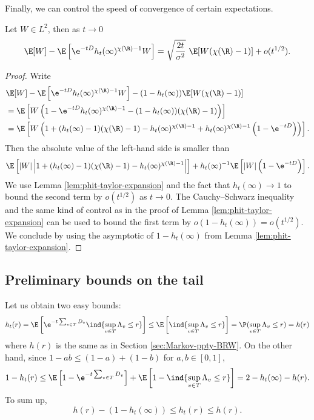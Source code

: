 \documentclass[10pt,a4paper]{article}
\begin{document}
Finally, we can control the speed of convergence of certain expectations. %
\begin{lemma}\label{lem:speed-cv-expectation-Et}
Let $W \in L^2$, then as $t\to 0$
\begin{equation}
\E[W] - \E\left[ \e^{-tD} h_t(\infty)^{\chi(\R)-1} W \right] = \sqrt{\frac{2t}{\sigma^2}} \ \E[ W(\chi(\R)-1) ] + o(t^{1/2}) .
\end{equation}
\end{lemma}

\begin{proof}
Write
\begin{align*}
&\E[W] - \E\left[ \e^{-tD} h_t(\infty)^{\chi(\R)-1} W \right] - (1-h_t(\infty)) \E[ W(\chi(\R)-1) ]  \\
&= \E\left[ W\left( 1 - \e^{-tD}h_t(\infty)^{\chi(\R)-1} - (1-h_t(\infty))(\chi(\R)-1) \right)\right] \\
&= \E\left[ W\left(1 + (h_t(\infty)-1)(\chi(\R)-1) - h_t(\infty)^{\chi(\R)-1} + h_t(\infty)^{\chi(\R)-1}\left( 1-\e^{-tD} \right) \right)\right] .
\end{align*}
Then the absolute value of the left-hand side is smaller than 
\begin{align*}
\E\left[|W| \left|1 + (h_t(\infty)-1)(\chi(\R)-1) - h_t(\infty)^{\chi(\R)-1}\right|\right] + h_t(\infty)^{-1} \E\left[|W| \left( 1-\e^{-tD} \right)\right] .
\end{align*}
We use Lemma \ref{lem:phit-taylor-expansion} and the fact that $h_t(\infty)\to 1$ to bound the second term by $o(t^{1/2})$ as $t\to 0$. The Cauchy--Schwarz inequality and the same kind of control as in the proof of Lemma \ref{lem:phit-taylor-expansion} can be used to bound the first term by $o(1-h_t(\infty)) = o(t^{1/2})$. We conclude by using the asymptotic of $1-h_t(\infty)$ from Lemma \ref{lem:phit-taylor-expansion}. 
\end{proof}









\subsection{Preliminary bounds on the tail}
\label{sec:2uniform-control}


Let us obtain two easy bounds:
\[ h_t(r) = \E\left[\e^{-t\sum_{v\in T} D_v} \ind{\sup_{v\in T} \Lambda_v \leq r}\right] \leq \E\left[ \ind{\sup_{v\in T} \Lambda_v \leq r}\right] = \P(\sup_{v\in T} \Lambda_v \leq r) = h(r) \]
where $h(r)$ is the same as in Section \ref{sec:Markov-ppty-BRW}. On the other hand, since $1-ab \leq (1-a)+(1-b)$ for $a,b\in [0,1]$, 
\[ 1-h_t(r) \leq \E\left[ 1 - \e^{-t\sum_{v\in T} D_v} \right] + \E\left[1 - \ind{\sup_{v\in T}\Lambda_v \leq r} \right] = 2 - h_t(\infty) - h(r) . \]
To sum up, 
\begin{equation}\label{eq:easy-bounds-htr}
h(r) - (1- h_t(\infty)) \leq h_t(r) \leq h(r) .
\end{equation}
\end{document}
